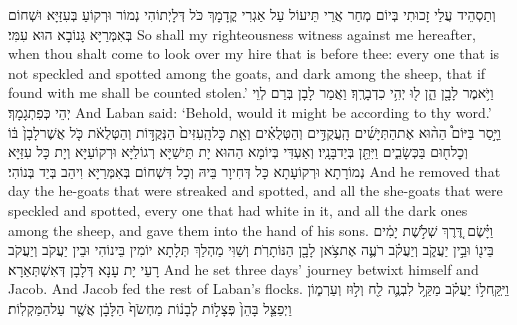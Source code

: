 {וְתַסְהֵיד עֲלַי זָכוּתִי בְּיוֹם מְחַר אֲרֵי תֵּיעוֹל עַל אַגְרִי קֳדָמָךְ כֹּל דְּלָיְתוֹהִי נְמוֹר וּרְקוֹעַ בְּעִזַּיָּא וּשְׁחוֹם בְּאִמְּרַיָּא גָּנוֹבָא הוּא עִמִּי׃}
{So shall my righteousness witness against me hereafter, when thou shalt come to look over my hire that is before thee: every one that is not speckled and spotted among the goats, and dark among the sheep, that if found with me shall be counted stolen.’}{}
{וַיֹּ֥אמֶר לָבָ֖ן הֵ֑ן ל֖וּ יְהִ֥י כִדְבָרֶֽךָ׃}
{וַאֲמַר לָבָן בְּרַם לְוֵי יְהֵי כְּפִתְגָמָךְ׃}
{And Laban said: ‘Behold, would it might be according to thy word.’}{}
{וַיָּ֣סַר בַּיּוֹם֩ הַה֨וּא אֶת\maqqaf הַתְּיָשִׁ֜ים הָֽעֲקֻדִּ֣ים וְהַטְּלֻאִ֗ים וְאֵ֤ת כׇּל\maqqaf הָֽעִזִּים֙ הַנְּקֻדּ֣וֹת וְהַטְּלֻאֹ֔ת כֹּ֤ל אֲשֶׁר\maqqaf לָבָן֙ בּ֔וֹ וְכׇל\maqqaf ח֖וּם בַּכְּשָׂבִ֑ים וַיִּתֵּ֖ן בְּיַד\maqqaf בָּנָֽיו׃}
{וְאַעְדִּי בְּיוֹמָא הַהוּא יָת תֵּישַׁיָּא רְגוֹלַיָּא וּרְקוֹעַיָּא וְיָת כָּל עִזַּיָּא נְמוֹרָתָא וּרְקוֹעָתָא כָּל דְּחִיוָר בֵּיהּ וְכָל דִּשְׁחוֹם בְּאִמְּרַיָּא וִיהַב בְּיַד בְּנוֹהִי׃}
{And he removed that day the he-goats that were streaked and spotted, and all the she-goats that were speckled and spotted, every one that had white in it, and all the dark ones among the sheep, and gave them into the hand of his sons.}{}
{וַיָּ֗שֶׂם דֶּ֚רֶךְ שְׁלֹ֣שֶׁת יָמִ֔ים בֵּינ֖וֹ וּבֵ֣ין יַעֲקֹ֑ב וְיַעֲקֹ֗ב רֹעֶ֛ה אֶת\maqqaf צֹ֥אן לָבָ֖ן הַנּוֹתָרֹֽת׃}
{וְשַׁוִּי מַהְלַךְ תְּלָתָא יוֹמִין בֵּינוֹהִי וּבֵין יַעֲקֹב וְיַעֲקֹב רָעֵי יָת עָנָא דְּלָבָן דְּאִשְׁתְּאַרָא׃}
{And he set three days’ journey betwixt himself and Jacob. And Jacob fed the rest of Laban’s flocks.}{}
{וַיִּֽקַּֽח\maqqaf ל֣וֹ יַעֲקֹ֗ב מַקַּ֥ל לִבְנֶ֛ה לַ֖ח וְל֣וּז וְעַרְמ֑וֹן וַיְפַצֵּ֤ל בָּהֵן֙ פְּצָל֣וֹת לְבָנ֔וֹת מַחְשֹׂף֙ הַלָּבָ֔ן אֲשֶׁ֖ר עַל\maqqaf הַמַּקְלֽוֹת׃}
